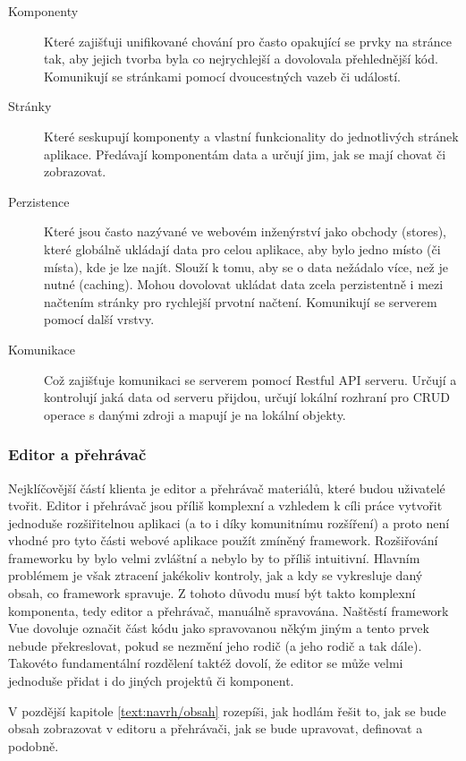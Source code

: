 \begin{description}
    \item[Komponenty] Které zajišťuji unifikované chování pro často opakující se prvky na stránce tak, aby jejich tvorba byla co nejrychlejší a dovolovala přehlednější kód. Komunikují se stránkami pomocí dvoucestných vazeb či událostí.
    \item[Stránky] Které seskupují komponenty a vlastní funkcionality do jednotlivých stránek aplikace. Předávají komponentám data a určují jim, jak se mají chovat či zobrazovat.
    \item[Perzistence] Které jsou často nazývané ve webovém inženýrství jako obchody (stores), které globálně ukládají data pro celou aplikace, aby bylo jedno místo (či místa), kde je lze najít. Slouží k tomu, aby se o data nežádalo více, než je nutné (caching). Mohou dovolovat ukládat data zcela perzistentně i mezi načtením stránky pro rychlejší prvotní načtení. Komunikují se serverem pomocí další vrstvy.
    \item[Komunikace] Což zajišťuje komunikaci se serverem pomocí Restful API serveru. Určují a kontrolují jaká data od serveru přijdou, určují lokální rozhraní pro CRUD operace s danými zdroji a mapují je na lokální objekty.
\end{description}

\subsubsection{Editor a přehrávač}

Nejklíčovější částí klienta je editor a přehrávač materiálů, které budou uživatelé tvořit.
Editor i přehrávač jsou příliš komplexní a vzhledem k cíli práce vytvořit jednoduše rozšiřitelnou aplikaci (a to i díky komunitnímu rozšíření) a proto není vhodné pro tyto části webové aplikace použít zmíněný framework.
Rozšiřování frameworku by bylo velmi zvláštní a nebylo by to příliš intuitivní.
Hlavním problémem je však ztracení jakékoliv kontroly, jak a kdy se vykresluje daný obsah, co framework spravuje.
Z tohoto důvodu musí být takto komplexní komponenta, tedy editor a přehrávač, manuálně spravována.
Naštěstí framework Vue dovoluje označit část kódu jako spravovanou někým jiným a tento prvek nebude překreslovat, pokud se nezmění jeho rodič (a jeho rodič a tak dále). 
Takovéto fundamentální rozdělení taktéž dovolí, že editor se může velmi jednoduše přidat i do jiných projektů či komponent.

V pozdější kapitole \ref{text:navrh/obsah} rozepíši, jak hodlám řešit to, jak se bude obsah zobrazovat v editoru a přehrávači, jak se bude upravovat, definovat a podobně.

